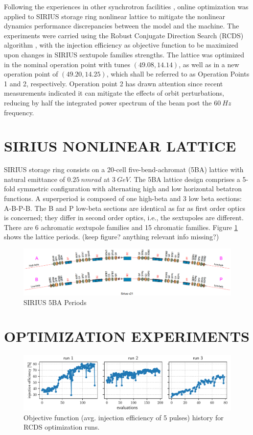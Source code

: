 \documentclass[a4paper,
               keeplastbox,   %
               ]{jacow}
\begin{document}
Following the experiences in other synchrotron facilities \cite{Huang:2015, Liuzzo:IPAC2016-THPMR015, Olsson:IPAC2018-WEPAL047, yang:ipac2022-tupopt064}, online optimization was applied to SIRIUS storage ring nonlinear lattice to mitigate the nonlinear dynamics performance discrepancies between the model and the machine. The experiments were carried using the Robust Conjugate Direction Search (RCDS) algorithm \cite{Huang:2013}, with the injection efficiency as objective function to be maximized upon changes in SIRIUS sextupole families strengths. The lattice was optimized in the nominal operation point with tunes $(49.08, 14.14)$, as well as in a new operation point of $(49.20, 14.25)$, which shall be referred to as Operation Points 1 and 2, respectively. Operation point 2 has drawn attention since recent measurements indicated it can mitigate the effects of orbit perturbations, reducing by half the integrated power spectrum of the beam post the $60~\unit{Hz}$ frequency.   

\section{SIRIUS NONLINEAR LATTICE}
 SIRIUS storage ring consists on a 20-cell five-bend-achromat (5BA) lattice with natural emittance of $0.25~\si{nm rad}$ at $3~\unit{GeV}$. The 5BA lattice design comprises a 5-fold symmetric configuration with alternating high and low horizontal betatron functions. A superperiod is composed of one high-beta and 3 low beta sections: A-B-P-B. The B and P low-beta sections are identical as far as first order optics is concerned; they differ in second order optics, i.e., the sextupoles are different. There are 6 achromatic sextupole families and 15 chromatic families. Figure \ref{fig:sirius} shows the lattice periods. (keep figure? anything relevant info missing?)
  \begin{figure}[!h]
     \centering
     \includegraphics[width=\columnwidth]{SI_superperiod.png}
     \caption{SIRIUS 5BA Periods}
     \label{fig:sirius}
 \end{figure}
\section{OPTIMIZATION EXPERIMENTS}
\begin{figure}[!h]
    \centering
    \includegraphics*[width=\textwidth]{oldtunes_runs123.pdf}
    \caption{Objective function (avg. injection efficiency of 5 pulses) history for RCDS optimization runs.}
    \label{fig:oldtunes_runs123}
\end{figure}
\end{document}
